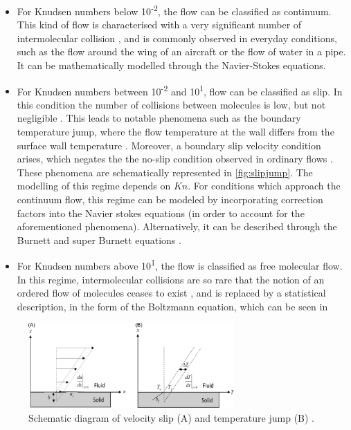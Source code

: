\begin{itemize}
    \item For Knudsen numbers below 10\textsuperscript{-2}, the flow can be classified as continuum. This kind of flow is characterised with a very significant number of intermolecular collision \cite{aerothermonotes, chambrerarefied}, and is commonly observed in everyday conditions, such as the flow around the wing of an aircraft or the flow of water in a pipe. It can be mathematically modelled through the Navier-Stokes equations.
    \item For Knudsen numbers between 10\textsuperscript{-2} and 10\textsuperscript{1}, flow can be classified as slip. In this condition the number of collisions between molecules is low, but not negligible \cite{chambrerarefied}. This leads to notable phenomena such as the boundary temperature jump, where the flow temperature at the wall differs from the surface wall temperature \cite{slipjump}. Moreover, a boundary slip velocity condition arises, which negates the the no-slip condition observed in ordinary flows \cite{slipjump}. These phenomena are schematically represented in \autoref{fig:slipjump}. The modelling of this regime depends on $Kn$. For conditions which approach the continuum flow, this regime can be modeled by incorporating correction factors into the Navier stokes equations \cite{slipjump} (in order to account for the aforementioned phenomena). Alternatively, it can be described through the Burnett and super Burnett equations \cite{burnett}.
    \item For Knudsen numbers above 10\textsuperscript{1}, the flow is classified as free molecular flow. In this regime, intermolecular collisions are so rare that the notion of an ordered flow of molecules ceases to exist \cite{aerothermonotes, chambrerarefied}, and is replaced by a statistical description, in the form of the Boltzmann equation, which can be seen in 
\end{itemize}
\begin{figure}[ht]
    \centering
    \includegraphics[width=0.7\textwidth]{../Images/2. Background/slipjump.png}
    \caption{Schematic diagram of velocity slip (A) and temperature jump (B)  \cite{slipjump}.}
    \label{fig:slipjump}
\end{figure}

